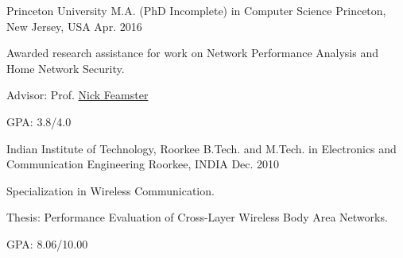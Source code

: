 

\begin{cventries}

\cventry
    {Princeton University} %
    {M.A. (PhD Incomplete) in Computer Science} %
    {Princeton, New Jersey, USA} %
    {Apr. 2016} %
    {
      \begin{cvitems} %
      	\item {Awarded research assistance for work on Network Performance Analysis and Home Network Security.}
      	\item {Advisor: Prof. \href{https://www.cs.princeton.edu/~feamster}{Nick Feamster}}
      	\item {GPA: 3.8/4.0}
      \end{cvitems}
    }

\cventry  
    {Indian Institute of Technology, Roorkee} %
    {B.Tech. and M.Tech. in Electronics and Communication Engineering} %
    {Roorkee, INDIA} %
    {Dec. 2010} %
    {
      \begin{cvitems} %
      	\item {Specialization in Wireless Communication.}
      	\item {Thesis: Performance Evaluation of Cross-Layer Wireless Body Area Networks.}
      	\item {GPA: 8.06/10.00}
      \end{cvitems}
    }

\end{cventries}

